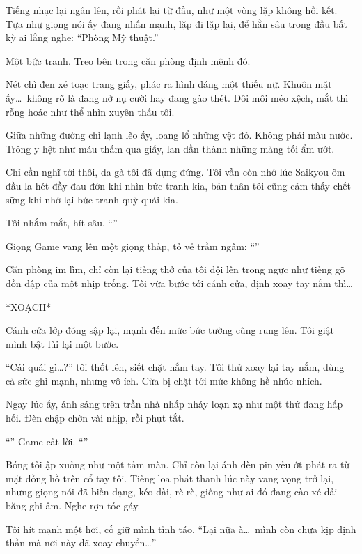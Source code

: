 \documentclass[../main.tex]{subfiles}
\begin{document}
Tiếng nhạc lại ngân lên, rồi phát lại từ đầu, như một vòng lặp không hồi kết. Tựa như giọng nói ấy đang nhấn mạnh, lặp đi lặp lại, để hằn sâu trong đầu bất kỳ ai lắng nghe: ``Phòng Mỹ thuật.''

Một bức tranh. Treo bên trong căn phòng định mệnh đó.

Nét chì đen xé toạc trang giấy, phác ra hình dáng một thiếu nữ. Khuôn mặt ấy\dots\ không rõ là đang nở nụ cười hay đang gào thét. Đôi môi méo xệch, mắt thì rỗng hoác như thể nhìn xuyên thấu tôi.

Giữa những đường chì lạnh lẽo ấy, loang lổ những vệt đỏ. Không phải màu nước. Trông y hệt như máu thấm qua giấy, lan dần thành những mảng tối ẩm ướt.

Chỉ cần nghĩ tới thôi, da gà tôi đã dựng đứng. Tôi vẫn còn nhớ lúc Saikyou ôm đầu la hét đầy đau đớn khi nhìn bức tranh kia, bản thân tôi cũng cảm thấy chết sững khi nhớ lại bức tranh quỷ quái kia.

Tôi nhắm mắt, hít sâu. ``''

Giọng Game vang lên một giọng thấp, tỏ vẻ trầm ngâm: ``''

Căn phòng im lìm, chỉ còn lại tiếng thở của tôi dội lên trong ngực như tiếng gõ dồn dập của một nhịp trống. Tôi vừa bước tới cánh cửa, định xoay tay nắm thì\dots

*XOẠCH*

Cánh cửa lớp đóng sập lại, mạnh đến mức bức tường cũng rung lên. Tôi giật mình bật lùi lại một bước.

``Cái quái gì\dots?'' tôi thốt lên, siết chặt nắm tay. Tôi thử xoay lại tay nắm, dùng cả sức ghì mạnh, nhưng vô ích. Cửa bị chặt tới mức không hề nhúc nhích.

Ngay lúc ấy, ánh sáng trên trần nhà nhấp nháy loạn xạ như một thứ đang hấp hối. Đèn chập chờn vài nhịp, rồi phụt tắt.

``'' Game cất lời. ``''

Bóng tối ập xuống như một tấm màn. Chỉ còn lại ánh đèn pin yếu ớt phát ra từ mặt đồng hồ trên cổ tay tôi. Tiếng loa phát thanh lúc này vang vọng trở lại, nhưng giọng nói đã biến dạng, kéo dài, rè rè, giống như ai đó đang cào xé dải băng ghi âm. Nghe rợn tóc gáy.

Tôi hít mạnh một hơi, cố giữ mình tỉnh táo. ``Lại nữa à\dots\ mình còn chưa kịp định thần mà nơi này đã xoay chuyển\dots''
\end{document}
